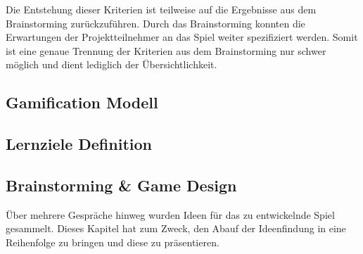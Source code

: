 	Die Entstehung dieser Kriterien ist teilweise auf die Ergebnisse aus dem Brainstorming zurückzuführen. Durch das Brainstorming konnten die Erwartungen der Projektteilnehmer an das Spiel weiter spezifiziert werden. Somit ist eine genaue Trennung der Kriterien aus dem Brainstorming nur schwer möglich und dient lediglich der Übersichtlichkeit.

\subsection{Gamification Modell}
\subsection{Lernziele Definition}

\subsection{Brainstorming \& Game Design}\label{ssec:idee}
	Über mehrere Gespräche hinweg wurden Ideen für das zu entwickelnde Spiel gesammelt. Dieses Kapitel hat zum Zweck, den Abauf der Ideenfindung in eine Reihenfolge zu bringen und diese zu präsentieren.
